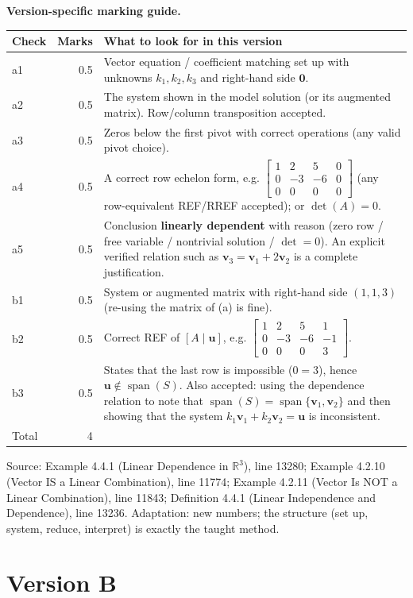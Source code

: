 \documentclass[11pt,a4paper]{article}
\newcommand{\Src}[1]{{\footnotesize\color{black!65}Source: #1}}
\begin{document}
\textbf{Version-specific marking guide.}\par
\begin{tabularx}{\linewidth}{@{}l r >{\raggedright\arraybackslash}X@{}}\toprule Check & Marks & What to look for in this version\\\midrule
a1 & 0.5 & Vector equation / coefficient matching set up with unknowns $k_1,k_2,k_3$ and right-hand side $\mathbf{0}$.\\
a2 & 0.5 & The system shown in the model solution (or its augmented matrix). Row/column transposition accepted.\\
a3 & 0.5 & Zeros below the first pivot with correct operations (any valid pivot choice).\\
a4 & 0.5 & A correct row echelon form, e.g. $\left[\begin{array}{ccc|c} 1 & 2 & 5 & 0 \\ 0 & -3 & -6 & 0 \\ 0 & 0 & 0 & 0 \end{array}\right]$ (any row-equivalent REF/RREF accepted); or $\det(A)=0$.\\
a5 & 0.5 & Conclusion \textbf{linearly dependent} with reason (zero row / free variable / nontrivial solution / $\det=0$). An explicit verified relation such as $\mathbf{v}_3=\mathbf{v}_1+2\mathbf{v}_2$ is a complete justification.\\
b1 & 0.5 & System or augmented matrix with right-hand side $(1,1,3)$ (re-using the matrix of (a) is fine).\\
b2 & 0.5 & Correct REF of $[A\mid\mathbf{u}]$, e.g. $\left[\begin{array}{ccc|c} 1 & 2 & 5 & 1 \\ 0 & -3 & -6 & -1 \\ 0 & 0 & 0 & 3 \end{array}\right]$.\\
b3 & 0.5 & States that the last row is impossible ($0=3$), hence $\mathbf{u}\notin\operatorname{span}(S)$. Also accepted: using the dependence relation to note that $\operatorname{span}(S)=\operatorname{span}\{\mathbf{v}_1,\mathbf{v}_2\}$ and then showing that the system $k_1\mathbf{v}_1+k_2\mathbf{v}_2=\mathbf{u}$ is inconsistent.\\
\midrule Total & 4 & \\\bottomrule\end{tabularx}
\Src{Example 4.4.1 (Linear Dependence in $\mathbb{R}^3$), line 13280; Example 4.2.10 (Vector IS a Linear Combination), line 11774; Example 4.2.11 (Vector Is NOT a Linear Combination), line 11843; Definition 4.4.1 (Linear Independence and Dependence), line 13236. Adaptation: new numbers; the structure (set up, system, reduce, interpret) is exactly the taught method.}\par
\clearpage\section*{Version B}
\end{document}
